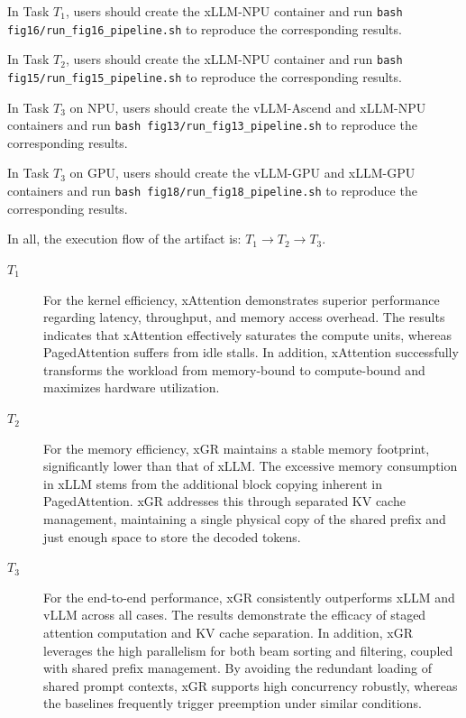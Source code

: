 \documentclass[conference]{IEEEtran}
\begin{document}
In Task $T_1$, users should create the xLLM-NPU container and run \texttt{bash fig16/run\_fig16\_pipeline.sh} to reproduce the corresponding results.

In Task $T_2$, users should create the xLLM-NPU container and run \texttt{bash fig15/run\_fig15\_pipeline.sh} to reproduce the corresponding results.

In Task $T_3$ on NPU, users should create the vLLM-Ascend and xLLM-NPU containers and run \texttt{bash fig13/run\_fig13\_pipeline.sh} to reproduce the corresponding results.

In Task $T_3$ on GPU, users should create the vLLM-GPU and xLLM-GPU containers and run \texttt{bash fig18/run\_fig18\_pipeline.sh} to reproduce the corresponding results.


In all, the execution flow of the artifact is: $T_1 \rightarrow T_2 \rightarrow T_3$.


\artout


\begin{description}

\item[$T_1$] For the kernel efficiency, xAttention demonstrates superior performance regarding latency, throughput, and memory access overhead. The results indicates that xAttention effectively saturates the compute units, whereas PagedAttention suffers from idle stalls. In addition, xAttention successfully transforms the workload from memory-bound to compute-bound and maximizes hardware utilization.

\item[$T_2$] For the memory efficiency, xGR maintains a stable memory footprint, significantly lower than that of xLLM. The excessive memory consumption in xLLM stems from the additional block copying inherent in PagedAttention. xGR addresses this through separated KV cache management, maintaining a single physical copy of the shared prefix and just enough space to store the decoded tokens.

\item[$T_3$] For the end-to-end performance, xGR consistently outperforms xLLM and vLLM across all cases. The results demonstrate the efficacy of staged attention computation and KV cache separation. In addition, xGR leverages the high parallelism for both beam sorting and filtering, coupled with shared prefix management. By avoiding the redundant loading of shared prompt contexts, xGR supports high concurrency robustly, whereas the baselines frequently trigger preemption under similar conditions. 

\end{description}
\end{document}
